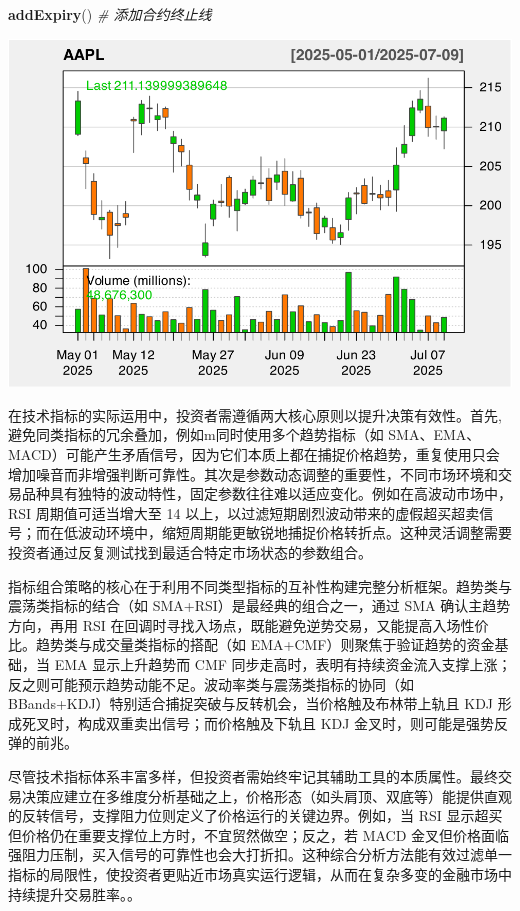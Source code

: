 \documentclass[]{ctexbook}
\newenvironment{Shaded}{\begin{snugshade}}{\end{snugshade}}
\newcommand{\CommentTok}[1]{\textcolor[rgb]{0.56,0.35,0.01}{\textit{#1}}}
\newcommand{\FunctionTok}[1]{\textcolor[rgb]{0.13,0.29,0.53}{\textbf{#1}}}
\newcommand{\NormalTok}[1]{#1}
\begin{document}
\begin{Shaded}
\begin{Highlighting}[]
\FunctionTok{addExpiry}\NormalTok{()  }\CommentTok{\# 添加合约终止线}
\end{Highlighting}
\end{Shaded}

\includegraphics[width=0.9\linewidth]{quantmod_files/figure-latex/expiry_ex-2}

在技术指标的实际运用中，投资者需遵循两大核心原则以提升决策有效性。首先,避免同类指标的冗余叠加，例如m同时使用多个趋势指标（如 SMA、EMA、MACD）可能产生矛盾信号，因为它们本质上都在捕捉价格趋势，重复使用只会增加噪音而非增强判断可靠性。其次是参数动态调整的重要性，不同市场环境和交易品种具有独特的波动特性，固定参数往往难以适应变化。例如在高波动市场中，RSI 周期值可适当增大至 14 以上，以过滤短期剧烈波动带来的虚假超买超卖信号；而在低波动环境中，缩短周期能更敏锐地捕捉价格转折点。这种灵活调整需要投资者通过反复测试找到最适合特定市场状态的参数组合。

指标组合策略的核心在于利用不同类型指标的互补性构建完整分析框架。趋势类与震荡类指标的结合（如 SMA+RSI）是最经典的组合之一，通过 SMA 确认主趋势方向，再用 RSI 在回调时寻找入场点，既能避免逆势交易，又能提高入场性价比。趋势类与成交量类指标的搭配（如 EMA+CMF）则聚焦于验证趋势的资金基础，当 EMA 显示上升趋势而 CMF 同步走高时，表明有持续资金流入支撑上涨；反之则可能预示趋势动能不足。波动率类与震荡类指标的协同（如 BBands+KDJ）特别适合捕捉突破与反转机会，当价格触及布林带上轨且 KDJ 形成死叉时，构成双重卖出信号；而价格触及下轨且 KDJ 金叉时，则可能是强势反弹的前兆。

尽管技术指标体系丰富多样，但投资者需始终牢记其辅助工具的本质属性。最终交易决策应建立在多维度分析基础之上，价格形态（如头肩顶、双底等）能提供直观的反转信号，支撑阻力位则定义了价格运行的关键边界。例如，当 RSI 显示超买但价格仍在重要支撑位上方时，不宜贸然做空；反之，若 MACD 金叉但价格面临强阻力压制，买入信号的可靠性也会大打折扣。这种综合分析方法能有效过滤单一指标的局限性，使投资者更贴近市场真实运行逻辑，从而在复杂多变的金融市场中持续提升交易胜率。。
\end{document}
